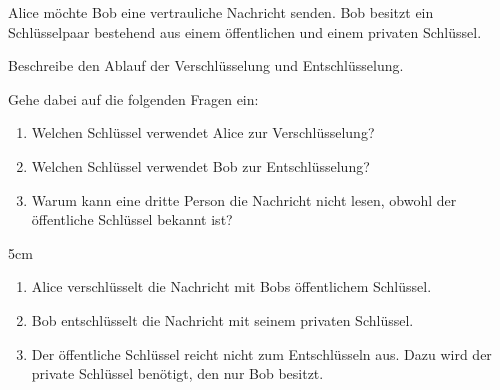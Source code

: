 \question[5]
Alice möchte Bob eine vertrauliche Nachricht senden. Bob besitzt ein
Schlüsselpaar bestehend aus einem öffentlichen und einem privaten Schlüssel.

Beschreibe den Ablauf der Verschlüsselung und Entschlüsselung.

Gehe dabei auf die folgenden Fragen ein:

\begin{enumerate}[label=\alph*)]
\item Welchen Schlüssel verwendet Alice zur Verschlüsselung?
\item Welchen Schlüssel verwendet Bob zur Entschlüsselung?
\item Warum kann eine dritte Person die Nachricht nicht lesen, obwohl der öffentliche Schlüssel bekannt ist?
\end{enumerate}

\begin{solutionbox}{5cm}
\begin{enumerate}[label=\alph*)]
\item Alice verschlüsselt die Nachricht mit Bobs öffentlichem Schlüssel.
\item Bob entschlüsselt die Nachricht mit seinem privaten Schlüssel.
\item Der öffentliche Schlüssel reicht nicht zum Entschlüsseln aus. Dazu wird der private Schlüssel benötigt, den nur Bob besitzt.
\end{enumerate}
\end{solutionbox}